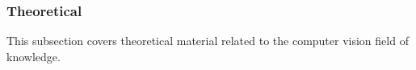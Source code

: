 \documentclass[../../../../main]{subfiles}
\begin{document}
\subsubsection{Theoretical}

This subsection covers theoretical material related to the computer vision field of knowledge.


\newpage


\newpage


\newpage


\newpage
\end{document}
